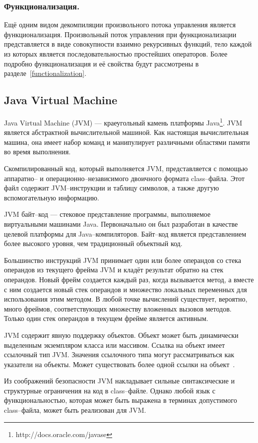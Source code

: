 \subsubsection*{Функционализация.}
Ещё одним видом декомпиляции произвольного потока управления является функционализация. Произвольный поток управления при функционализации представляется в виде совокупности взаимно рекурсивных функций, тело каждой из которых является последовательностью простейших операторов. Более подробно функционализация и её свойства будут рассмотрены в разделе~\ref{functionalization}.

\subsection{Java Virtual Machine}
Java Virtual Machine (JVM) --- краеугольный камень платформы Java\footnote{http://docs.oracle.com/javase}. JVM является абстрактной вычислительной машиной. Как настоящая вычислительная машина, она имеет набор команд и манипулирует различными областями памяти во время выполнения. 

Скомпилированный код, который выполняется JVM, представляется с помощью аппаратно-- и операционно--независимого двоичного формата class--файла. Этот файл содержит JVM--инструкции и таблицу символов, а также другую вспомогательную информацию.

JVM байт--код --- стековое представление программы, выполняемое виртуальными машинами Java. Первоначально он был разработан в качестве целевой платформы для Java--компиляторов. Байт--код является представлением более высокого уровня, чем традиционный объектный код.

Большинство инструкций JVM принимает один или более операндов со стека операндов из текущего фрейма JVM и кладёт результат обратно на стек операндов. Новый фрейм создается каждый раз, когда вызывается метод, а вместе с ним создается новый стек операндов и множество локальных переменных для использования этим методом. В любой точке вычислений существует, вероятно, много фреймов, соответствующих множеству вложенных вызовов методов. Только один стек операндов в текущем фрейме является активным.

JVM содержит явную поддержку объектов. Объект может быть динамически выделенным экземпляром класса или массивом. Ссылка на объект имеет ссылочный тип JVM. Значения ссылочного типа могут рассматриваться как указатели на объекты. Может существовать более одной ссылки на объект~\cite{jvm}.

Из соображений безопасности JVM накладывает сильные синтаксические и структурные ограничения на код в class--файле. Однако любой язык с функциональностью, которая может быть выражена в терминах допустимого class--файла, может быть реализован для JVM. 

